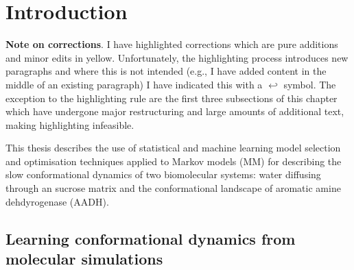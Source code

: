 %
%
\let\textcircled=\pgftextcircled
\chapter{Introduction}
\label{chap:intro}

\begin{highlighted}
\textbf{Note on corrections}.  I have highlighted corrections which are pure additions and minor edits in yellow. Unfortunately, the highlighting process introduces new paragraphs and where this is not intended (e.g., I have added content in the middle of an existing paragraph) I have indicated this with a $\hookleftarrow$ symbol. The exception to the highlighting rule are the first three subsections of this chapter which have undergone major restructuring and large amounts of additional text, making highlighting infeasible. 
\end{highlighted}



This thesis describes the use of statistical and machine learning  model selection and optimisation techniques applied to Markov models (MM) for describing the slow conformational dynamics of two biomolecular systems: water diffusing through an sucrose matrix and the conformational landscape of aromatic amine dehdyrogenase (AADH).

\section{Learning conformational dynamics from molecular simulations}


